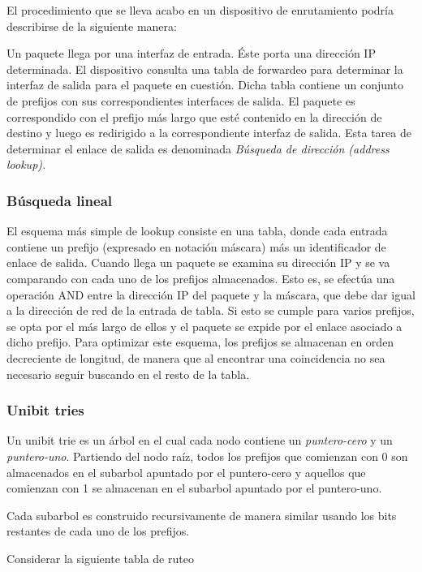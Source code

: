 El procedimiento que se lleva acabo en un dispositivo de enrutamiento podría describirse de la siguiente manera:

Un paquete llega por una interfaz de entrada. Éste porta una dirección IP determinada. El dispositivo consulta una tabla de forwardeo para determinar la interfaz de salida para el paquete en cuestión. Dicha tabla contiene un conjunto de prefijos con sus correspondientes interfaces de salida. El paquete es correspondido con el prefijo más largo que esté contenido en la dirección de destino y luego es redirigido  a la correspondiente interfaz de salida. Esta tarea de determinar el enlace de salida es denominada \textit{Búsqueda de dirección (address lookup).}

\subsubsection{Búsqueda lineal}

El esquema más simple de lookup consiste en una tabla, donde cada entrada contiene un prefijo (expresado en notación máscara) más un identificador de enlace de salida. Cuando llega un paquete se examina su dirección IP y se va comparando con cada uno de los prefijos almacenados. Esto es, se efectúa una operación AND entre la dirección IP del paquete y la máscara, que debe dar igual a la dirección de red de la entrada de tabla. Si esto se cumple para varios prefijos, se opta por el más largo de ellos y el paquete se expide por el enlace asociado a dicho prefijo.
Para optimizar este esquema, los prefijos se almacenan en orden decreciente de longitud, de manera que al encontrar una coincidencia no sea necesario seguir buscando en el resto de la tabla.

\subsubsection {Unibit tries}

Un unibit trie es un árbol en el cual cada nodo contiene un \textit{puntero-cero }y un \textit{puntero-uno}. Partiendo del nodo raíz, todos los prefijos que comienzan con 0 son almacenados en el subarbol apuntado por el puntero-cero y aquellos que comienzan con 1 se almacenan en el subarbol apuntado por el puntero-uno.

Cada subarbol es construido recursivamente de manera similar usando los bits restantes de cada uno de los prefijos.

Considerar la siguiente tabla de ruteo

